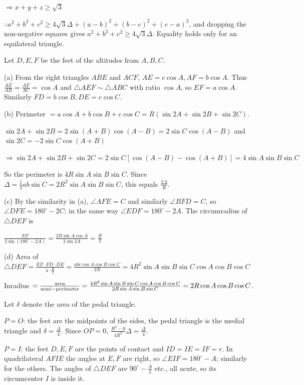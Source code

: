   $\Rightarrow x + y + z\geq \sqrt{3}$

  $\therefore a^2 + b^2 + c^2\geq 4\sqrt{3}\Delta + (a - b)^2 + (b - c)^2 + (c - a)^2$, and dropping the
  non-negative squares gives $a^2 + b^2 + c^2\geq 4\sqrt{3}\Delta$. Equality holds only for an equilateral
  triangle.
\item Let $D, E, F$ be the feet of the altitudes from $A, B, C$.

  (a) From the right triangles $ABE$ and $ACF$, $AE = c\cos A, AF = b\cos A$. Thus $\frac{AE}{AB} =
  \frac{AF}{AC} = \cos A$ and $\triangle AEF\sim\triangle ABC$ with ratio $\cos A$, so $EF = a\cos A$.
  Similarly $FD = b\cos B, DE = c\cos C$.

  (b) Perimeter $= a\cos A + b\cos B + c\cos C = R(\sin2A + \sin2B + \sin2C)$.

  $\sin2A + \sin2B = 2\sin(A + B)\cos(A - B) = 2\sin C\cos(A - B)$ and $\sin2C = -2\sin C\cos(A + B)$

  $\Rightarrow \sin2A + \sin2B + \sin2C = 2\sin C[\cos(A - B) - \cos(A + B)] = 4\sin A\sin B\sin C$

  So the perimeter is $4R\sin A\sin B\sin C$. Since $\Delta = \frac{1}{2}ab\sin C = 2R^2\sin A\sin B\sin C$,
  this equals $\frac{2\Delta}{R}$.

  (c) By the similarity in (a), $\angle AFE = C$ and similarly $\angle BFD = C$, so $\angle DFE = 180^\circ -
  2C$; in the same way $\angle EDF = 180^\circ - 2A$. The circumradius of $\triangle DEF$ is

  $\frac{EF}{2\sin(180^\circ - 2A)} = \frac{2R\sin A\cos A}{2\sin2A} = \frac{R}{2}$

  (d) Area of $\triangle DEF = \frac{EF\cdot FD\cdot DE}{4\cdot\frac{R}{2}} = \frac{abc\cos A\cos B\cos
  C}{2R} = 4R^2\sin A\sin B\sin C\cos A\cos B\cos C$

  Inradius $= \frac{\rm area}{\rm semi-perimeter} = \frac{4R^2\sin A\sin B\sin C\cos A\cos B\cos C}{2R\sin
  A\sin B\sin C} = 2R\cos A\cos B\cos C$.
\item Let $\delta$ denote the area of the pedal triangle.

  $P = O$: the feet are the midpoints of the sides, the pedal triangle is the medial triangle and $\delta =
  \frac{\Delta}{4}$. Since $OP = 0$, $\frac{R^2 - 0}{4R^2}\Delta = \frac{\Delta}{4}$.

  $P = I$: the feet $D, E, F$ are the points of contact and $ID = IE = IF = r$. In quadrilateral $AFIE$ the
  angles at $E, F$ are right, so $\angle EIF = 180^\circ - A$; similarly for the others. The angles of
  $\triangle DEF$ are $90^\circ - \frac{A}{2}$ etc., all acute, so its circumcenter $I$ is inside it.

